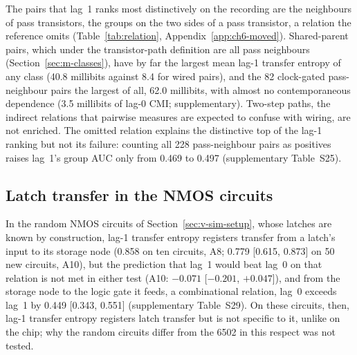 The pairs that lag~1 ranks most distinctively on the recording are the neighbours of pass transistors, the groups on the two sides of a pass transistor, a relation the reference omits (Table~\ref{tab:relation}, Appendix~\ref{app:ch6-moved}). Shared-parent pairs, which under the transistor-path definition are all pass neighbours (Section~\ref{sec:m-classes}), have by far the largest mean lag-1 transfer entropy of any class (40.8 millibits against 8.4 for wired pairs), and the 82 clock-gated pass-neighbour pairs the largest of all, 62.0 millibits, with almost no contemporaneous dependence (3.5 millibits of lag-0 CMI; supplementary). Two-step paths, the indirect relations that pairwise measures are expected to confuse with wiring, are not enriched. The omitted relation explains the distinctive top of the lag-1 ranking but not its failure: counting all 228 pass-neighbour pairs as positives raises lag~1's group AUC only from 0.469 to 0.497 (supplementary Table~S25).



\subsection{Latch transfer in the NMOS circuits}
\label{sec:v-nmos-latch}

In the random NMOS circuits of Section~\ref{sec:v-sim-setup}, whose latches are known by construction, lag-1 transfer entropy registers transfer from a latch's input to its storage node (0.858 on ten circuits, A8; 0.779 [0.615, 0.873] on 50 new circuits, A10), but the prediction that lag~1 would beat lag~0 on that relation is not met in either test (A10: $-0.071$ [$-0.201$, $+0.047$]), and from the storage node to the logic gate it feeds, a combinational relation, lag~0 exceeds lag~1 by 0.449 [0.343, 0.551] (supplementary Table~S29). On these circuits, then, lag-1 transfer entropy registers latch transfer but is not specific to it, unlike on the chip; why the random circuits differ from the 6502 in this respect was not tested.



